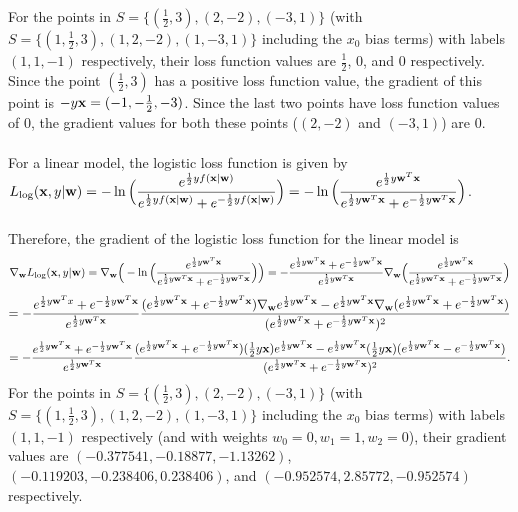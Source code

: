 For the points in $S = \{(\frac{1}{2}, 3), (2, -2), (-3, 1)\}$ (with $S = \{(1, \frac{1}{2}, 3), (1, 2, -2), (1, -3, 1)\}$ including the $x_0$ bias terms) with labels $(1, 1, -1)$ respectively, their loss function values are $\frac{1}{2}$, $0$, and $0$ respectively. Since the point $(\frac{1}{2}, 3)$ has a positive loss function value, the gradient of this point is $- y \mathbf{x} = (-1, -\frac{1}{2}, -3)$. Since the last two points have loss function values of 0, the gradient values for both these points ($(2, -2)$ and $(-3, 1)$) are 0.\\
\\
For a linear model, the logistic loss function is given by\\
$L_{\text{log}}(\mathbf{x}, y \vert \mathbf{w}) = -\ln\Big(\dfrac{e^{\frac{1}{2}y f(\mathbf{x} \vert \mathbf{w})}}{e^{\frac{1}{2}y f(\mathbf{x} \vert \mathbf{w})} + e^{-\frac{1}{2}y f(\mathbf{x} \vert \mathbf{w})}}\Big) = -\ln\Big(\dfrac{e^{\frac{1}{2}y \mathbf{w}^T \mathbf{x}}}{e^{\frac{1}{2}y \mathbf{w}^T \mathbf{x}} + e^{-\frac{1}{2}y \mathbf{w}^T \mathbf{x}}}\Big)$.\\
\\
Therefore, the gradient of the logistic loss function for the linear model is
\[ \nabla_{\mathbf{w}}L_{\text{log}}(\mathbf{x}, y \vert \mathbf{w}) = \nabla_{\mathbf{w}} \Big(-\ln\Big(\dfrac{e^{\frac{1}{2}y \mathbf{w}^T \mathbf{x}}}{e^{\frac{1}{2}y \mathbf{w}^T \mathbf{x}} + e^{-\frac{1}{2}y \mathbf{w}^T \mathbf{x}}}\Big)\Big) = -\dfrac{e^{\frac{1}{2}y \mathbf{w}^T \mathbf{x}} + e^{-\frac{1}{2}y \mathbf{w}^T \mathbf{x}}}{e^{\frac{1}{2}y \mathbf{w}^T \mathbf{x}}} \nabla_{\mathbf{w}} \Big(\dfrac{e^{\frac{1}{2}y \mathbf{w}^T \mathbf{x}}}{e^{\frac{1}{2}y \mathbf{w}^T \mathbf{x}} + e^{-\frac{1}{2}y \mathbf{w}^T \mathbf{x}}}\Big) \]
\[ = -\dfrac{e^{\frac{1}{2}y \mathbf{w}^T x} + e^{-\frac{1}{2}y \mathbf{w}^T \mathbf{x}}}{e^{\frac{1}{2}y \mathbf{w}^T \mathbf{x}}} \dfrac{({e^{\frac{1}{2}y \mathbf{w}^T \mathbf{x}} + e^{-\frac{1}{2}y \mathbf{w}^T \mathbf{x}}}) \nabla_{\mathbf{w}} {e^{\frac{1}{2}y \mathbf{w}^T \mathbf{x}}} - {e^{\frac{1}{2}y \mathbf{w}^T \mathbf{x}}} \nabla_{\mathbf{w}}({e^{\frac{1}{2}y \mathbf{w}^T \mathbf{x}} + e^{-\frac{1}{2}y \mathbf{w}^T \mathbf{x}}})}{({e^{\frac{1}{2}y \mathbf{w}^T \mathbf{x}} + e^{-\frac{1}{2}y \mathbf{w}^T \mathbf{x}}})^2} \]
\[ = -\dfrac{e^{\frac{1}{2}y \mathbf{w}^T \mathbf{x}} + e^{-\frac{1}{2}y \mathbf{w}^T \mathbf{x}}}{e^{\frac{1}{2}y \mathbf{w}^T \mathbf{x}}} \dfrac{({e^{\frac{1}{2}y \mathbf{w}^T \mathbf{x}} + e^{-\frac{1}{2}y \mathbf{w}^T \mathbf{x}}}) (\frac{1}{2} y \mathbf{x}){e^{\frac{1}{2}y \mathbf{w}^T \mathbf{x}}} - {e^{\frac{1}{2}y \mathbf{w}^T \mathbf{x}}} (\frac{1}{2} y \mathbf{x})({e^{\frac{1}{2}y \mathbf{w}^T \mathbf{x}} - e^{-\frac{1}{2}y \mathbf{w}^T \mathbf{x}}})}{({e^{\frac{1}{2}y \mathbf{w}^T \mathbf{x}} + e^{-\frac{1}{2}y \mathbf{w}^T \mathbf{x}}})^2}. \]
For the points in $S = \{(\frac{1}{2}, 3), (2, -2), (-3, 1)\}$ (with $S = \{(1, \frac{1}{2}, 3), (1, 2, -2), (1, -3, 1)\}$ including the $x_0$ bias terms) with labels $(1, 1, -1)$ respectively (and with weights $w_0 = 0, w_1 = 1, w_2 = 0$), their gradient values are $(-0.377541, -0.18877, -1.13262)$, $(-0.119203, -0.238406, 0.238406)$, and $(-0.952574, 2.85772, -0.952574)$ respectively.

